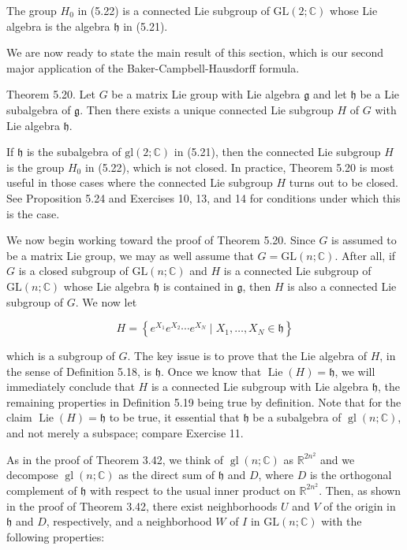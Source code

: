 \documentclass[10pt, letterpaper]{article}
\begin{document}
The group $H_{0}$ in (5.22) is a connected Lie subgroup of $\mathrm{GL}(2 ; \mathbb{C})$ whose Lie algebra is the algebra $\mathfrak{h}$ in (5.21).

We are now ready to state the main result of this section, which is our second major application of the Baker-Campbell-Hausdorff formula.

Theorem 5.20. Let $G$ be a matrix Lie group with Lie algebra $\mathfrak{g}$ and let $\mathfrak{h}$ be a Lie subalgebra of $\mathfrak{g}$. Then there exists a unique connected Lie subgroup $H$ of $G$ with Lie algebra $\mathfrak{h}$.

If $\mathfrak{h}$ is the subalgebra of $\mathrm{gl}(2 ; \mathbb{C})$ in (5.21), then the connected Lie subgroup $H$ is the group $H_{0}$ in (5.22), which is not closed. In practice, Theorem 5.20 is most useful in those cases where the connected Lie subgroup $H$ turns out to be closed. See Proposition 5.24 and Exercises 10, 13, and 14 for conditions under which this is the case.

We now begin working toward the proof of Theorem 5.20. Since $G$ is assumed to be a matrix Lie group, we may as well assume that $G=\mathrm{GL}(n ; \mathbb{C})$. After all, if $G$ is a closed subgroup of $\mathrm{GL}(n ; \mathbb{C})$ and $H$ is a connected Lie subgroup of $\mathrm{GL}(n ; \mathbb{C})$ whose Lie algebra $\mathfrak{h}$ is contained in $\mathfrak{g}$, then $H$ is also a connected Lie subgroup of $G$. We now let

$$
H=\left\{e^{X_{1}} e^{X_{2}} \cdots e^{X_{N}} \mid X_{1}, \ldots, X_{N} \in \mathfrak{h}\right\}
$$

which is a subgroup of $G$. The key issue is to prove that the Lie algebra of $H$, in the sense of Definition 5.18, is $\mathfrak{h}$. Once we know that $\operatorname{Lie}(H)=\mathfrak{h}$, we will immediately conclude that $H$ is a connected Lie subgroup with Lie algebra $\mathfrak{h}$, the remaining properties in Definition 5.19 being true by definition. Note that for the claim $\operatorname{Lie}(H)=\mathfrak{h}$ to be true, it essential that $\mathfrak{h}$ be a subalgebra of $\operatorname{gl}(n ; \mathbb{C})$, and not merely a subspace; compare Exercise 11.

As in the proof of Theorem 3.42, we think of $\operatorname{gl}(n ; \mathbb{C})$ as $\mathbb{R}^{2 n^{2}}$ and we decompose $\operatorname{gl}(n ; \mathbb{C})$ as the direct sum of $\mathfrak{h}$ and $D$, where $D$ is the orthogonal complement of $\mathfrak{h}$ with respect to the usual inner product on $\mathbb{R}^{2 n^{2}}$. Then, as shown in the proof of Theorem 3.42, there exist neighborhoods $U$ and $V$ of the origin in $\mathfrak{h}$ and $D$, respectively, and a neighborhood $W$ of $I$ in $\mathrm{GL}(n ; \mathbb{C})$ with the following properties:
\end{document}
